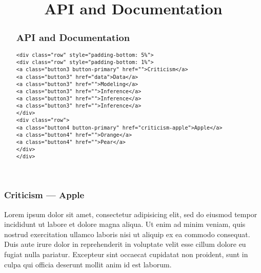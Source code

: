 \title{API and Documentation}

\begin{abstract}
\subsection{API and Documentation}
\begin{lstlisting}[raw=html]
<div class="row" style="padding-bottom: 5%">
<div class="row" style="padding-bottom: 1%">
<a class="button3 button-primary" href="">Criticism</a>
<a class="button3" href="data">Data</a>
<a class="button3" href="">Modeling</a>
<a class="button3" href="">Inference</a>
<a class="button3" href="">Inference</a>
<a class="button3" href="">Inference</a>
</div>
<div class="row">
<a class="button4 button-primary" href="criticism-apple">Apple</a>
<a class="button4" href="">Orange</a>
<a class="button4" href="">Pear</a>
</div>
</div>
\end{lstlisting}
\end{abstract}

\subsubsection{Criticism --- Apple}
Lorem ipsum dolor sit amet, consectetur adipisicing elit, sed do eiusmod
tempor incididunt ut labore et dolore magna aliqua. Ut enim ad minim veniam,
quis nostrud exercitation ullamco laboris nisi ut aliquip ex ea commodo
consequat. Duis aute irure dolor in reprehenderit in voluptate velit esse
cillum dolore eu fugiat nulla pariatur. Excepteur sint occaecat cupidatat non
proident, sunt in culpa qui officia deserunt mollit anim id est laborum.

